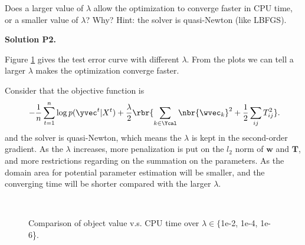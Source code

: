 \documentclass[11pt]{report}
\begin{document}
Does a larger value of $\lambda$ allow the optimization to converge faster in CPU time,
or a smaller value of $\lambda$?  Why?
Hint: the solver is quasi-Newton (like LBFGS).

{\bf Solution P2.}

Figure \ref{fig:compare_cpuTime} gives the test error curve with different $\lambda$. From the plots we can tell a larger $\lambda$ makes the optimization converge faster. 

Consider that the objective function is 
\begin{align}
\label{eq:obj_MLE}
   \ -\frac{1}{n}\sum_{t=1}^n \log p(\yvec^t | X^t) + \frac{\lambda}{2} \rbr{\sum_{k \in \Ycal} \nbr{\wvec_k}^2 + \frac{1}{2} \sum_{ij} T^2_{ij}}.
\end{align} 
and the solver is quasi-Newton, which means the $\lambda$ is kept in the second-order gradient.
As the $\lambda$ increases, more penalization is put on the $l_2$ norm of $\boldsymbol{w}$ and $\boldsymbol{T}$, and  more restrictions regarding on the summation on the parameters. As the domain area for potential parameter estimation will be smaller, and the converging time will be shorter compared with the larger $\lambda$. 

\begin{figure}[t]
\centering
{}
~~
~~
\caption{Comparison of object value v.s. CPU time over $\lambda \in \{${\sf 1e-2, 1e-4, 1e-6}\}.}
\label{fig:compare_cpuTime}
\end{figure}
\end{document}
